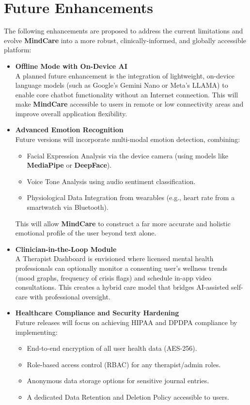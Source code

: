 \documentclass[a4paper,12pt]{report}
\begin{document}
\section{Future Enhancements}
The following enhancements are proposed to address the current limitations and evolve \textbf{MindCare} into a more robust, clinically-informed, and globally accessible platform:
\begin{itemize}
    \item \textbf{Offline Mode with On-Device AI}\\
    A planned future enhancement is the integration of lightweight, on-device language models (such as Google's Gemini Nano or Meta's LLAMA) to enable core chatbot functionality without an Internet connection. This will make \textbf{MindCare} accessible to users in remote or low connectivity areas and improve overall application flexibility.
    
    \item \textbf{Advanced Emotion Recognition}\\
    Future versions will incorporate multi-modal emotion detection, combining:
    \begin{itemize}
        \item Facial Expression Analysis via the device camera (using models like \textbf{MediaPipe} or \textbf{DeepFace}).
        \item Voice Tone Analysis using audio sentiment classification.
        \item Physiological Data Integration from wearables (e.g., heart rate from a smartwatch via Bluetooth).
    \end{itemize}
    This will allow \textbf{MindCare} to construct a far more accurate and holistic emotional profile of the user beyond text alone.
    
    \item \textbf{Clinician-in-the-Loop Module}\\
    A Therapist Dashboard is envisioned where licensed mental health professionals can optionally monitor a consenting user's wellness trends (mood graphs, frequency of crisis flags) and schedule in-app video consultations. This creates a hybrid care model that bridges AI-assisted self-care with professional oversight.
    
    \item \textbf{Healthcare Compliance and Security Hardening}\\
    Future releases will focus on achieving HIPAA and DPDPA compliance by implementing:
    \begin{itemize}
        \item End-to-end encryption of all user health data (AES-256).
        \item Role-based access control (RBAC) for any therapist/admin roles.
        \item Anonymous data storage options for sensitive journal entries.
        \item A dedicated Data Retention and Deletion Policy accessible to users.
    \end{itemize}
    

\end{itemize}
\end{document}
